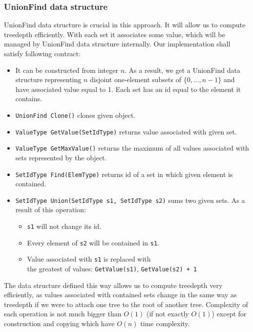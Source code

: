 \subsubsection{UnionFind data structure}
UnionFind data structure is crucial in this approach. It will allow us to compute treedepth efficiently. With each set it associates some value, which will be managed by UnionFind data structure internally. Our implementation shall satisfy following contract:
\begin{itemize}
	\item It can be constructed from integer $n$. As a result, we get a UnionFind data structure representing $n$ disjoint one-element subsets of $\{0,...,n-1\}$ and have associated value equal to 1. Each set has an id equal to the element it contains.
	\item \texttt{UnionFind Clone()} clones given object.
	\item \texttt{ValueType GetValue(SetIdType)} returns value associated with given set.
	\item \texttt{ValueType GetMaxValue()} returns the maximum of all values associated with sets represented by the object.
	\item \texttt{SetIdType Find(ElemType)} returns id of a set in which given element is contained.
	\item \texttt{SetIdType Union(SetIdType s1, SetIdType s2)} sums two given sets. As a result of this operation:
	\begin{itemize}
		\item \texttt{s1} will not change its id.
		\item Every element of \texttt{s2} will be contained in \texttt{s1}.
		\item Value associated with \texttt{s1} is replaced with \\ the greatest of values: \texttt{GetValue(s1)}, \texttt{GetValue(s2) + 1}
	\end{itemize}
\end{itemize}
The data structure defined this way allows us to compute treedepth very efficiently, as values associated with contained sets change in the same way as treedepth if we were to attach one tree to the root of another tree. Complexity of each operation is not much bigger than $O(1)$ (if not exactly $O(1)$) except for construction and copying which have $O(n)$ time complexity.
